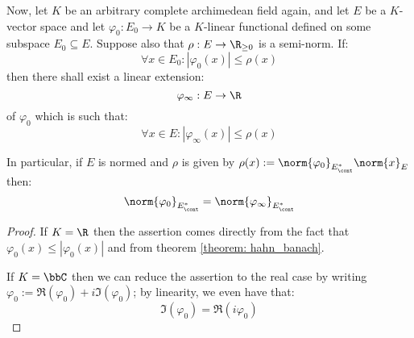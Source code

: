         \begin{corollary} \label{coro: norm_extensions}
            Now, let $K$ be an arbitrary complete archimedean field again, and let $E$ be a $K$-vector space and let $\varphi_0: E_0 \to K$ be a $K$-linear functional defined on some subspace $E_0 \subseteq E$. Suppose also that $\rho: E \to \R_{\geq 0}$ is a semi-norm. If:
                $$\forall x \in E_0: |\varphi_0(x)| \leq \rho(x)$$
            then there shall exist a linear extension:
                $$\varphi_{\infty}: E \to \R$$
            of $\varphi_0$ which is such that:
                $$\forall x \in E: |\varphi_{\infty}(x)| \leq \rho(x)$$

            In particular, if $E$ is normed and $\rho$ is given by $\rho(x) := \norm{\varphi_0}_{E^*_{\cont}} \norm{x}_E$ then:
                $$\norm{\varphi_0}_{E^*_{\cont}} = \norm{\varphi_{\infty}}_{E^*_{\cont}}$$
        \end{corollary}
            \begin{proof}
                If $K = \R$ then the assertion comes directly from the fact that $\varphi_0(x) \leq |\varphi_0(x)|$ and from theorem \ref{theorem: hahn_banach}.

                If $K = \bbC$ then we can reduce the assertion to the real case by writing $\varphi_0 := \Re(\varphi_0) + i \Im(\varphi_0)$; by linearity, we even have that:
                    $$\Im(\varphi_0) = \Re(i \varphi_0)$$
            \end{proof}


